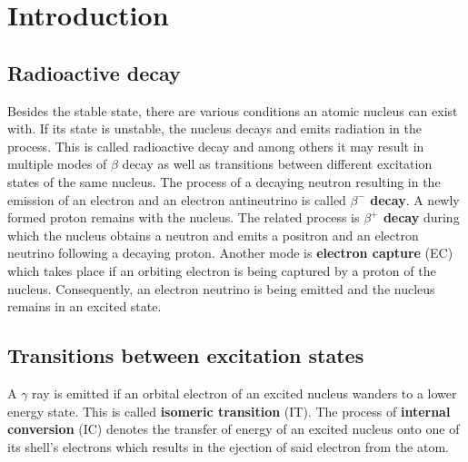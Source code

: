 \section*{Introduction}
%
\subsection*{Radioactive decay}
Besides the stable state, there are various conditions an atomic nucleus can exist with.
If its state is unstable, the nucleus decays and emits radiation in the process.
This is called radioactive decay and among others it may result in multiple modes of $\beta$ decay as well as transitions between different excitation states of the same nucleus.
The process of a decaying neutron resulting in the emission of an electron and an electron antineutrino is called \textbf{$\beta^{-}$ decay}.
A newly formed proton remains with the nucleus.
The related process is \textbf{$\beta^{+}$ decay} during which the nucleus obtains a neutron and emits a positron and an electron neutrino following a decaying proton.
Another mode is \textbf{electron capture} (EC) which takes place if an orbiting electron is being captured by a proton of the nucleus. Consequently, an electron neutrino is being emitted and the nucleus remains in an excited state.
%
\subsection*{Transitions between excitation states}
A $\gamma$ ray is emitted if an orbital electron of an excited nucleus wanders to a lower energy state.
This is called \textbf{isomeric transition} (IT).
The process of \textbf{internal conversion} (IC) denotes the transfer of energy of an excited nucleus onto one of its shell's electrons which results in the ejection of said electron from the atom.
%
